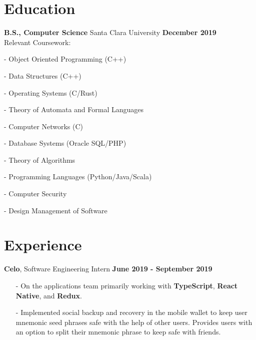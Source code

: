 \documentclass[margin,line]{res}
\begin{document}
\newcommand{\myname}{Derrick Lee}
\newlength{\mynamewidth}
\settowidth{\mynamewidth}{\namefont\myname}

\name{\hspace*{0.5\textwidth}\hspace{-0.5\mynamewidth} \myname \vspace*{.1in}}
\thispagestyle{empty}

\begin{resume}



\section{\sc Education}
{\bf B.S., Computer Science} Santa Clara University \hfill {\bf December 2019} \\
Relevant Coursework:
\begin{itemize} \itemsep -2pt
  \begin{multicols}{2} \raggedcolumns
  \item[-] Object Oriented Programming (C++)
  \item[-] Data Structures (C++)
  \item[-] Operating Systems (C/Rust)
  \item[-] Theory of Automata and Formal Languages
  \item[-] Computer Networks (C)
  \item[-] Database Systems (Oracle SQL/PHP)
  \item[-] Theory of Algorithms
  \item[-] Programming Languages (Python/Java/Scala)
  \item[-] Computer Security
  \item[-] Design Management of Software
  \end{multicols}
\end{itemize}
\vspace{-7.5mm}

\section{\sc Experience}
  {\bf Celo}, Software Engineering Intern \hfill {\bf June 2019 - September 2019} \\
  \vspace{-3.5mm}
  \begin{itemize} \itemsep -2pt
    \item[-] On the applications team primarily working with {\bf TypeScript},
    {\bf React Native}, and {\bf Redux}.
    \item[-] Implemented social backup and recovery in the mobile wallet to keep
    user mnemonic seed phrases safe with the help of other users. Provides
    users with an option to split their mnemonic phrase to keep safe with friends.
  \end{itemize}


\end{resume}
\end{document}
